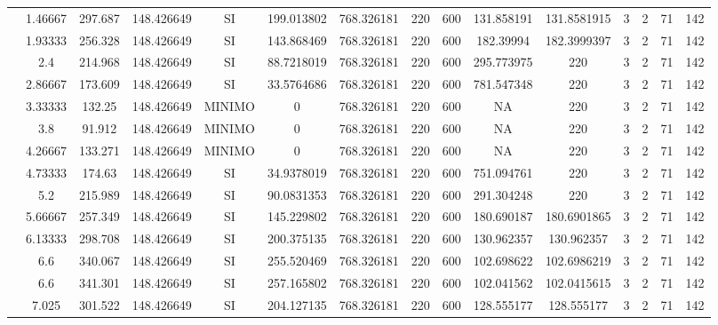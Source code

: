 \begin{table}[H]
{\begin{tabular}{|c|c|c|c|c|c|c|c|c|c|c|c|c|c|c|}
\cline{2-15}    & 1.46667 & 297.687 & 148.426649 & SI  & 199.013802 & 768.326181 & 220 & 600 & 131.858191 & 131.8581915 & 3   & 2   & 71  & 142 \bigstrut\\
\cline{2-15}    & 1.93333 & 256.328 & 148.426649 & SI  & 143.868469 & 768.326181 & 220 & 600 & 182.39994 & 182.3999397 & 3   & 2   & 71  & 142 \bigstrut\\
\cline{2-15}    & 2.4 & 214.968 & 148.426649 & SI  & 88.7218019 & 768.326181 & 220 & 600 & 295.773975 & 220 & 3   & 2   & 71  & 142 \bigstrut\\
\cline{2-15}    & 2.86667 & 173.609 & 148.426649 & SI  & 33.5764686 & 768.326181 & 220 & 600 & 781.547348 & 220 & 3   & 2   & 71  & 142 \bigstrut\\
\cline{2-15}    & 3.33333 & 132.25 & 148.426649 & MINIMO & 0   & 768.326181 & 220 & 600 & NA  & 220 & 3   & 2   & 71  & 142 \bigstrut\\
\cline{2-15}    & 3.8 & 91.912 & 148.426649 & MINIMO & 0   & 768.326181 & 220 & 600 & NA  & 220 & 3   & 2   & 71  & 142 \bigstrut\\
\cline{2-15}    & 4.26667 & 133.271 & 148.426649 & MINIMO & 0   & 768.326181 & 220 & 600 & NA  & 220 & 3   & 2   & 71  & 142 \bigstrut\\
\cline{2-15}    & 4.73333 & 174.63 & 148.426649 & SI  & 34.9378019 & 768.326181 & 220 & 600 & 751.094761 & 220 & 3   & 2   & 71  & 142 \bigstrut\\
\cline{2-15}    & 5.2 & 215.989 & 148.426649 & SI  & 90.0831353 & 768.326181 & 220 & 600 & 291.304248 & 220 & 3   & 2   & 71  & 142 \bigstrut\\
\cline{2-15}    & 5.66667 & 257.349 & 148.426649 & SI  & 145.229802 & 768.326181 & 220 & 600 & 180.690187 & 180.6901865 & 3   & 2   & 71  & 142 \bigstrut\\
\cline{2-15}    & 6.13333 & 298.708 & 148.426649 & SI  & 200.375135 & 768.326181 & 220 & 600 & 130.962357 & 130.962357 & 3   & 2   & 71  & 142 \bigstrut\\
\cline{2-15}    & 6.6 & 340.067 & 148.426649 & SI  & 255.520469 & 768.326181 & 220 & 600 & 102.698622 & 102.6986219 & 3   & 2   & 71  & 142 \bigstrut\\
\cline{2-15}    & 6.6 & 341.301 & 148.426649 & SI  & 257.165802 & 768.326181 & 220 & 600 & 102.041562 & 102.0415615 & 3   & 2   & 71  & 142 \bigstrut\\
\cline{2-15}    & 7.025 & 301.522 & 148.426649 & SI  & 204.127135 & 768.326181 & 220 & 600 & 128.555177 & 128.555177 & 3   & 2   & 71  & 142 \bigstrut\\

\end{tabular}}
\end{table}
